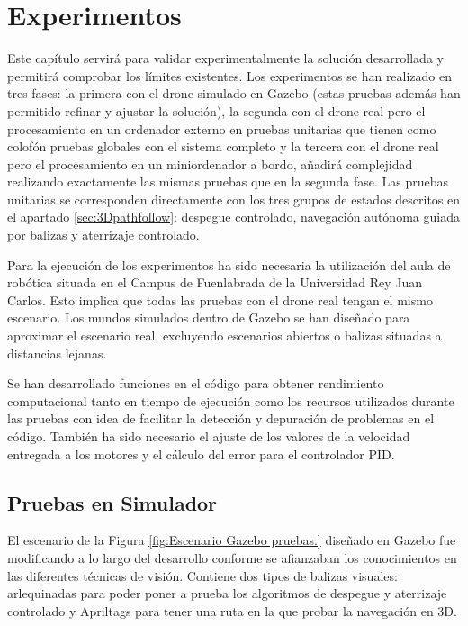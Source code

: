 \chapter{Experimentos}\label{cap.experimentos}

Este capítulo servirá para validar experimentalmente la solución desarrollada y permitirá comprobar los límites existentes. Los experimentos se han realizado en tres fases: la primera con el drone simulado en Gazebo (estas pruebas además han permitido refinar y ajustar la solución), la segunda con el drone real pero el procesamiento en un ordenador externo en pruebas unitarias que tienen como colofón pruebas globales con el sistema completo y la tercera con el drone real pero el procesamiento en un miniordenador a bordo, añadirá complejidad realizando exactamente las mismas pruebas que en la segunda fase. Las pruebas unitarias se corresponden directamente con los tres grupos de estados descritos en el apartado \ref{sec:3Dpathfollow}: despegue controlado, navegación autónoma guiada por balizas y aterrizaje controlado.

Para la ejecución de los experimentos ha sido necesaria la utilización del aula de robótica situada en el Campus de Fuenlabrada de la Universidad Rey Juan Carlos. Esto implica que todas las pruebas con el drone real tengan el mismo escenario. Los mundos simulados dentro de Gazebo se han diseñado para aproximar el escenario real, excluyendo escenarios abiertos o balizas situadas a distancias lejanas.

Se han desarrollado funciones en el código para obtener  rendimiento computacional tanto en tiempo de ejecución como los recursos utilizados durante las pruebas con idea de facilitar la detección y depuración de problemas en el código. También ha sido necesario el ajuste de los valores de la velocidad entregada a los motores y el cálculo del error para el controlador PID.

\section{Pruebas en Simulador}

El escenario de la Figura \ref{fig:Escenario Gazebo pruebas.} diseñado en Gazebo fue modificando a lo largo del desarrollo conforme se afianzaban los conocimientos en las diferentes técnicas de visión. Contiene dos tipos de balizas visuales: arlequinadas para poder poner a prueba los algoritmos de despegue y aterrizaje controlado y Apriltags para tener una ruta en la que probar la navegación en 3D.

